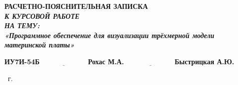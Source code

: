 \begin{titlepage}
	
	\begin{center}
		\Large\textbf{РАСЧЕТНО-ПОЯСНИТЕЛЬНАЯ ЗАПИСКА}\\
		\large\textit{\textbf{К КУРСОВОЙ РАБОТЕ}}\\
            \large\textbf{\textit{НА ТЕМУ:}}\\
            \textbf{\textit{«Программное обеспечение для визуализации трёхмерной модели материнской платы»}}
	\end{center}\vspace{2cm}

	
	\hspace{1cm}\textbf{ИУ7И-54Б}\hfill$\underline{\text{~~~~~~~~~~~~~~~~~~~~~}}$\>\textbf{Рохас М.А.}\>\>\>\>\>\>\newline\newline
	\hspace{1cm}\hfill$\underline{\text{~~~~~~~~~~~~~~~~~~~~~}}$\>\textbf{Быстрицкая А.Ю.}\newline\newline
	
	\begin{center}
		\vfill
		\the\year
		~г.
	\end{center}
\end{titlepage}
